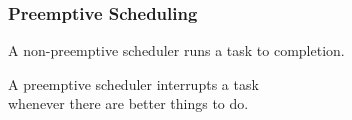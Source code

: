 



\begin{frame}

\frametitle{Preemptive Scheduling}

\vspace{\fill}

\begin{center}

A non-preemptive scheduler runs a task to completion.

\end{center}

\begin{center}

A preemptive scheduler interrupts a task \\ whenever there are better things to
do.

\end{center}

\vspace{\fill}

\end{frame}








